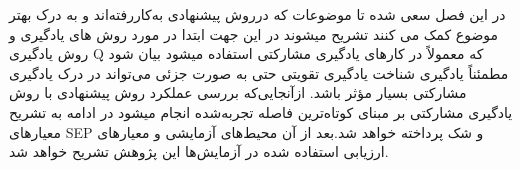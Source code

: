 در این فصل سعی شده تا موضوعات که درروش پیشنهادی به‌کاررفته‌اند و به درک بهتر موضوع کمک می کنند تشریح میشوند در این جهت ابتدا در مورد روش های یادگیری و روش یادگیری Q که معمولاً در کارهای یادگیری مشارکتی استفاده  میشود بیان شود مطمئناً یادگیری شناخت یادگیری تقویتی حتی به ‌صورت جزئی می‌تواند در درک یادگیری مشارکتی بسیار مؤثر باشد.
ازآنجایی‌که بررسی عملکرد روش پیشنهادی با روش یادگیری مشارکتی بر مبنای کوتاه‌ترین فاصله تجربه‌شده انجام میشود در ادامه به تشریح معیارهای SEP و شک پرداخته خواهد شد.بعد از آن محیط‌های آزمایشی و معیارهای ارزیابی استفاده شده در آزمایش‌ها این پژوهش تشریح خواهد شد.